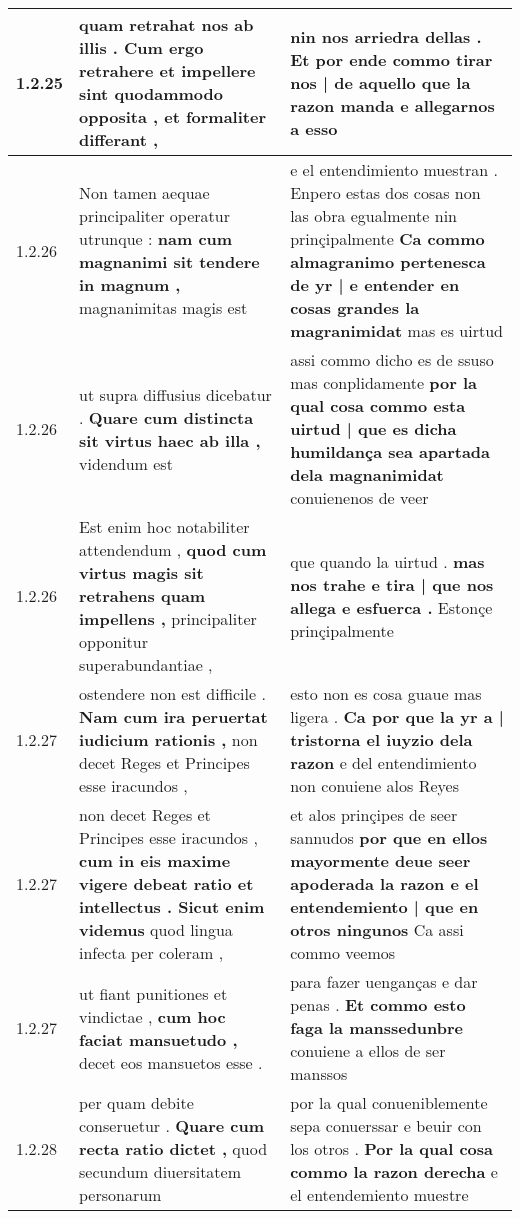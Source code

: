 \begin{tabular}{|p{1cm}|p{6.5cm}|p{6.5cm}|}
1.2.25 & quam retrahat nos ab illis . \textbf{ Cum ergo retrahere et impellere sint quodammodo opposita , } et formaliter differant , & nin nos arriedra dellas . \textbf{ Et por ende commo tirar nos | de aquello que la razon manda } e allegarnos a esso \\\hline
1.2.26 & Non tamen aequae principaliter operatur utrunque : \textbf{ nam cum magnanimi sit tendere in magnum , } magnanimitas magis est & e el entendimiento muestran . Enpero estas dos cosas non las obra egualmente nin prinçipalmente \textbf{ Ca commo almagranimo pertenesca de yr | e entender en cosas grandes la magranimidat } mas es uirtud \\\hline
1.2.26 & ut supra diffusius dicebatur . \textbf{ Quare cum distincta sit virtus haec ab illa , } videndum est & assi commo dicho es de ssuso mas conplidamente \textbf{ por la qual cosa commo esta uirtud | que es dicha humildança sea apartada dela magnanimidat } conuienenos de veer \\\hline
1.2.26 & Est enim hoc notabiliter attendendum , \textbf{ quod cum virtus magis sit retrahens quam impellens , } principaliter opponitur superabundantiae , & que quando la uirtud . \textbf{ mas nos trahe e tira | que nos allega e esfuerca . } Estonçe prinçipalmente \\\hline
1.2.27 & ostendere non est difficile . \textbf{ Nam cum ira peruertat iudicium rationis , } non decet Reges et Principes esse iracundos , & esto non es cosa guaue mas ligera . \textbf{ Ca por que la yr a | tristorna el iuyzio dela razon } e del entendimiento non conuiene alos Reyes \\\hline
1.2.27 & non decet Reges et Principes esse iracundos , \textbf{ cum in eis maxime vigere debeat ratio et intellectus . Sicut enim videmus } quod lingua infecta per coleram , & et alos prinçipes de seer sannudos \textbf{ por que en ellos mayormente deue seer apoderada la razon e el entendemiento | que en otros ningunos } Ca assi commo veemos \\\hline
1.2.27 & ut fiant punitiones et vindictae , \textbf{ cum hoc faciat mansuetudo , } decet eos mansuetos esse . & para fazer uenganças e dar penas . \textbf{ Et commo esto faga la manssedunbre } conuiene a ellos de ser manssos \\\hline
1.2.28 & per quam debite conseruetur . \textbf{ Quare cum recta ratio dictet , } quod secundum diuersitatem personarum & por la qual conueniblemente sepa conuerssar e beuir con los otros . \textbf{ Por la qual cosa commo la razon derecha } e el entendemiento muestre \\\hline

\end{tabular}
